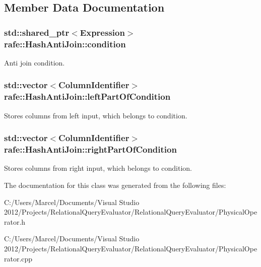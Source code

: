 \subsection{Member Data Documentation}
\hypertarget{classrafe_1_1_hash_anti_join_a23275305fdc386ac5cd85a72e3cf35b5}{
\subsubsection[{condition}]{\setlength{\rightskip}{0pt plus 5cm}std\+::shared\+\_\+ptr$<${\bf Expression}$>$ rafe\+::\+Hash\+Anti\+Join\+::condition}}\label{classrafe_1_1_hash_anti_join_a23275305fdc386ac5cd85a72e3cf35b5}
Anti join condition. \hypertarget{classrafe_1_1_hash_anti_join_aee96d4c1b6379eddfce548a5ad0733f0}{
\subsubsection[{left\+Part\+Of\+Condition}]{\setlength{\rightskip}{0pt plus 5cm}std\+::vector$<${\bf Column\+Identifier}$>$ rafe\+::\+Hash\+Anti\+Join\+::left\+Part\+Of\+Condition}}\label{classrafe_1_1_hash_anti_join_aee96d4c1b6379eddfce548a5ad0733f0}
Stores columns from left input, which belongs to condition. \hypertarget{classrafe_1_1_hash_anti_join_a3d1f9f90ff58e9af2c24cf432a5c8508}{
\subsubsection[{right\+Part\+Of\+Condition}]{\setlength{\rightskip}{0pt plus 5cm}std\+::vector$<${\bf Column\+Identifier}$>$ rafe\+::\+Hash\+Anti\+Join\+::right\+Part\+Of\+Condition}}\label{classrafe_1_1_hash_anti_join_a3d1f9f90ff58e9af2c24cf432a5c8508}
Stores columns from right input, which belongs to condition. 

The documentation for this class was generated from the following files\+:\begin{DoxyCompactItemize}
\item 
C\+:/\+Users/\+Marcel/\+Documents/\+Visual Studio 2012/\+Projects/\+Relational\+Query\+Evaluator/\+Relational\+Query\+Evaluator/Physical\+Operator.\+h\item 
C\+:/\+Users/\+Marcel/\+Documents/\+Visual Studio 2012/\+Projects/\+Relational\+Query\+Evaluator/\+Relational\+Query\+Evaluator/Physical\+Operator.\+cpp\end{DoxyCompactItemize}
